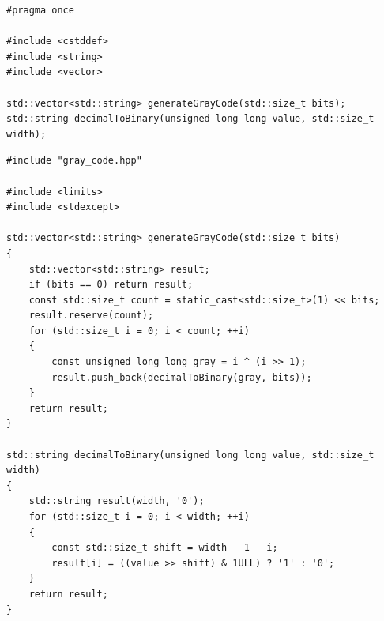 \documentclass[14pt,a4paper]{extreport}
\begin{document}
\begin{listing}[H]
\caption{gray\_code.hpp}
\begin{lstlisting}
#pragma once

#include <cstddef>
#include <string>
#include <vector>

std::vector<std::string> generateGrayCode(std::size_t bits);
std::string decimalToBinary(unsigned long long value, std::size_t width);
\end{lstlisting}
\end{listing}

\begin{listing}[H]
\caption{gray\_code.cpp}
\begin{lstlisting}
#include "gray_code.hpp"

#include <limits>
#include <stdexcept>

std::vector<std::string> generateGrayCode(std::size_t bits)
{
    std::vector<std::string> result;
    if (bits == 0) return result;
    const std::size_t count = static_cast<std::size_t>(1) << bits;
    result.reserve(count);
    for (std::size_t i = 0; i < count; ++i)
    {
        const unsigned long long gray = i ^ (i >> 1);
        result.push_back(decimalToBinary(gray, bits));
    }
    return result;
}

std::string decimalToBinary(unsigned long long value, std::size_t width)
{
    std::string result(width, '0');
    for (std::size_t i = 0; i < width; ++i)
    {
        const std::size_t shift = width - 1 - i;
        result[i] = ((value >> shift) & 1ULL) ? '1' : '0';
    }
    return result;
}
\end{lstlisting}
\end{listing}
\end{document}
